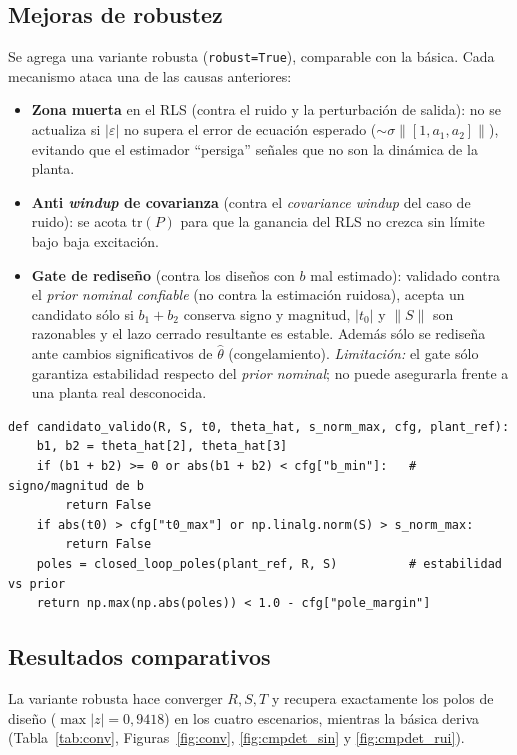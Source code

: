 \documentclass[a4paper,11pt]{report}
\begin{document}
\subsection{Mejoras de robustez}

Se agrega una variante robusta (\texttt{robust=True}), comparable con la básica.
Cada mecanismo ataca una de las causas anteriores:
\begin{itemize}[nosep]
  \item \textbf{Zona muerta} en el RLS (contra el ruido y la perturbación de
  salida): no se actualiza si $|\varepsilon|$ no supera el error de ecuación
  esperado ($\sim\sigma\lVert[1,a_1,a_2]\rVert$), evitando que el estimador
  ``persiga'' señales que no son la dinámica de la planta.
  \item \textbf{Anti \emph{windup} de covarianza} (contra el \emph{covariance
  windup} del caso de ruido): se acota $\mathrm{tr}(P)$ para que la ganancia del
  RLS no crezca sin límite bajo baja excitación.
  \item \textbf{Gate de rediseño} (contra los diseños con $b$ mal estimado):
  validado contra el \emph{prior nominal confiable} (no contra la estimación
  ruidosa), acepta un candidato sólo si $b_1{+}b_2$ conserva signo y magnitud,
  $|t_0|$ y $\lVert S\rVert$ son razonables y el lazo cerrado resultante es
  estable. Además sólo se rediseña ante cambios significativos de $\hat\theta$
  (congelamiento). \emph{Limitación:} el gate sólo garantiza estabilidad respecto
  del \emph{prior nominal}; no puede asegurarla frente a una planta real
  desconocida.
\end{itemize}

\begin{lstlisting}[caption={Gate de aceptación del regulador candidato (robusto).}]
def candidato_valido(R, S, t0, theta_hat, s_norm_max, cfg, plant_ref):
    b1, b2 = theta_hat[2], theta_hat[3]
    if (b1 + b2) >= 0 or abs(b1 + b2) < cfg["b_min"]:   # signo/magnitud de b
        return False
    if abs(t0) > cfg["t0_max"] or np.linalg.norm(S) > s_norm_max:
        return False
    poles = closed_loop_poles(plant_ref, R, S)          # estabilidad vs prior
    return np.max(np.abs(poles)) < 1.0 - cfg["pole_margin"]
\end{lstlisting}

\subsection{Resultados comparativos}

La variante robusta hace converger $R,S,T$ y recupera exactamente los polos de
diseño ($\max|z| = 0{,}9418$) en los cuatro escenarios, mientras la básica deriva
(Tabla~\ref{tab:conv}, Figuras~\ref{fig:conv}, \ref{fig:cmpdet_sin} y
\ref{fig:cmpdet_rui}).
\end{document}
